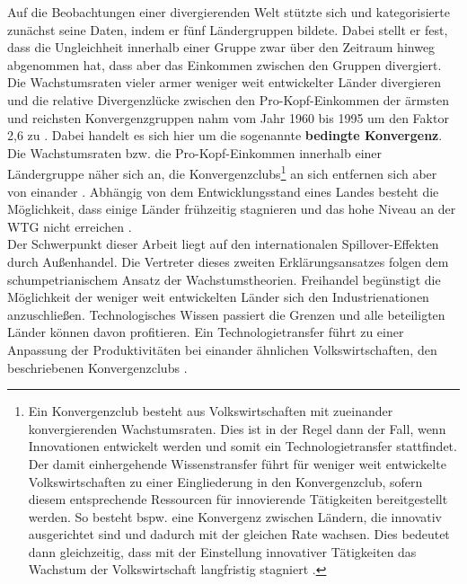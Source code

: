 Auf die Beobachtungen einer divergierenden Welt stützte sich \cite{MayerFoulkes.2006} und kategorisierte zunächst seine Daten, indem er fünf Ländergruppen bildete. Dabei stellt er fest, dass die Ungleichheit innerhalb einer Gruppe zwar über den Zeitraum hinweg abgenommen hat, dass aber das Einkommen zwischen den Gruppen divergiert. Die Wachstumsraten vieler armer weniger weit entwickelter Länder divergieren und die relative Divergenzlücke zwischen den Pro-Kopf-Einkommen der ärmsten und reichsten Konvergenzgruppen nahm vom Jahr 1960 bis 1995 um den Faktor 2,6 zu \cite{MayerFoulkes.2006}. Dabei handelt es sich hier um die sogenannte \textbf{bedingte Konvergenz}. Die Wachstumsraten bzw. die Pro-Kopf-Einkommen innerhalb einer Ländergruppe näher sich an, die Konvergenzclubs\footnote{Ein Konvergenzclub besteht aus Volkswirtschaften mit zueinander konvergierenden Wachstumsraten. Dies ist in der Regel dann der Fall, wenn Innovationen entwickelt werden und somit ein Technologietransfer stattfindet. Der damit einhergehende Wissenstransfer führt für weniger weit entwickelte Volkswirtschaften zu einer Eingliederung in den Konvergenzclub, sofern diesem entsprechende Ressourcen für innovierende Tätigkeiten bereitgestellt werden. So besteht bspw. eine Konvergenz zwischen Ländern, die innovativ ausgerichtet sind und dadurch mit der gleichen Rate wachsen. Dies bedeutet dann gleichzeitig, dass mit der Einstellung innovativer Tätigkeiten das Wachstum der Volkswirtschaft langfristig stagniert \cite{Aghion.2015}.} an sich entfernen sich aber von einander \cite{Quah.1993,Howitt.2000,Howitt.2005}. Abhängig von dem Entwicklungsstand eines Landes besteht die Möglichkeit, dass einige Länder frühzeitig stagnieren und das hohe Niveau an der WTG nicht erreichen \cite{Aghion.1992,Barro.1997,Howitt.2005}.\\
%
Der Schwerpunkt dieser Arbeit liegt auf den internationalen Spillover-Effekten durch Außenhandel.
Die Vertreter dieses zweiten Erklärungsansatzes folgen dem schumpetrianischem Ansatz der Wachstumstheorien. Freihandel begünstigt die Möglichkeit der weniger weit entwickelten Länder sich den Industrienationen anzuschließen. Technologisches Wissen passiert die Grenzen und alle beteiligten Länder können davon profitieren. 
Ein Technologietransfer führt zu einer Anpassung der Produktivitäten bei einander ähnlichen Volkswirtschaften, den beschriebenen Konvergenzclubs \cite{Durlauf.1995,Quah.1993,Quah.1997}.\\
%
